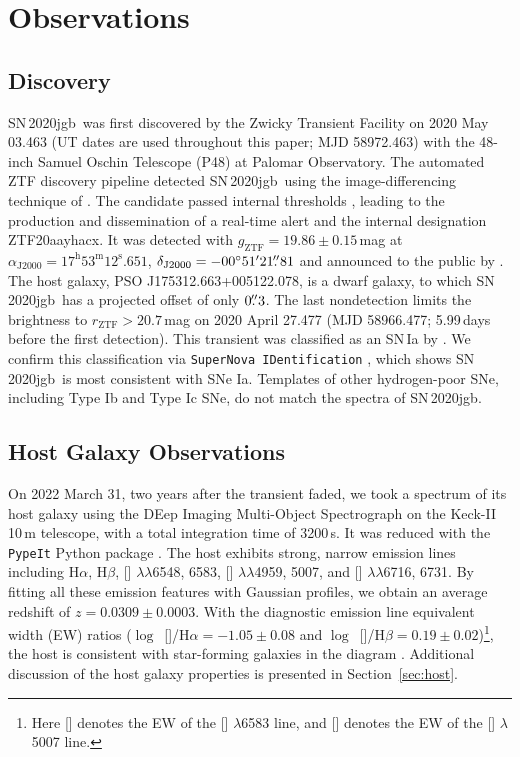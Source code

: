 \documentclass[twocolumn]{aastex631}
\newcommand{\sn}{SN\,2020jgb}
\begin{document}
\section{Observations} \label{sec:obs}
\subsection{Discovery}

\sn\ was first discovered by the Zwicky Transient Facility \citep[ZTF;][]{Bellm_ZTF_2019a,Graham_ZTF_2019, Dekany_ZTF_2020} on 2020 May 03.463 (UT dates are used throughout this paper; MJD 58972.463) with the 48-inch Samuel Oschin Telescope (P48) at Palomar Observatory. The automated ZTF discovery pipeline \citep{Masci_ZTF_2019} detected \sn\ using the image-differencing technique of \citet{Zackay_imagesub_2016}. The candidate passed internal thresholds \citep[e.g.,][]{Mahabal_ZTFML_2019, Duev_ZTFML_2019}, leading to the production and dissemination of a real-time alert \citep{Patterson_ZTFalert_2019} and the internal designation ZTF20aayhacx. It was detected with $g_\mathrm{ZTF} = 19.86 \pm 0.15\,$mag at $\alpha_\mathrm{J2000}=17^\mathrm{h}53^\mathrm{m}12^\mathrm{s}.651$, $\delta_\mathrm{J2000}=-00^\circ51'21\mbox{$.\!\!^{\prime\prime}$}{81}$ and announced to the public by \citet{Fremling_report_2020}. The host galaxy, PSO J175312.663+005122.078, is a dwarf galaxy, to which \sn\ has a projected offset of only $0\mbox{$.\!\!^{\prime\prime}$}3$. The last nondetection limits the brightness to $r_\mathrm{ZTF} > 20.7$\,mag on 2020 April 27.477 (MJD 58966.477; 5.99\,days before the first detection). This transient was classified as an SN\,Ia by \citet{TNS_2020}. We confirm this classification via \texttt{SuperNova IDentification} \citep[\texttt{SNID};][]{Blondin_SNID_2007}, which shows \sn\ is most consistent with SNe Ia. Templates of other hydrogen-poor SNe, including Type Ib and Type Ic SNe, do not match the spectra of \sn.

\subsection{Host Galaxy Observations}
On 2022 March 31, two years after the transient faded, we took a spectrum of its host galaxy using the DEep Imaging Multi-Object Spectrograph \citep[DEIMOS;][]{DEIMOS_2003} on the Keck-II 10\,m telescope, with a total integration time of 3200\,s. It was reduced with the \texttt{PypeIt} Python package \citep{pypeit:joss_pub}. The host exhibits strong, narrow emission lines including H$\alpha$, H$\beta$, [] $\lambda\lambda$6548, 6583, [] $\lambda\lambda$4959, 5007, and [] $\lambda\lambda$6716, 6731. By fitting all these emission features with Gaussian profiles, we obtain an average redshift of $z=0.0309\pm0.0003$. With the diagnostic emission line equivalent width (EW) ratios ($\log$~[]/H$\alpha=-1.05\pm0.08$ and $\log$~[]/H$\beta=0.19\pm0.02$)\footnote{Here [] denotes the EW of the [] $\lambda$6583 line, and [] denotes the EW of the [] $\lambda$5007 line.}, the host is consistent with star-forming galaxies in the \citet[][hereafter BPT]{BPT_1981} diagram \citep[see also][]{Veilleux_1987}. Additional discussion of the host galaxy properties is presented in Section~\ref{sec:host}.
\end{document}
